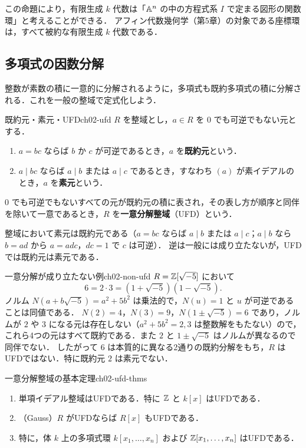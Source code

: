 この命題により，有限生成 $k$ 代数は「$\mathbb{A}^n$ の中の方程式系 $I$ で定まる図形の関数環」と考えることができる．
アフィン代数幾何学（第5章）の対象である座標環は，すべて被約な有限生成 $k$ 代数である．

\subsection{多項式の因数分解}

整数が素数の積に一意的に分解されるように，多項式も既約多項式の積に分解される．これを一般の整域で定式化しよう．

\begin{mydef}{既約元・素元・UFD}{ch02-ufd}
$R$ を整域とし，$a\in R$ を $0$ でも可逆でもない元とする．
\begin{enumerate}
  \item $a=bc$ ならば $b$ か $c$ が可逆であるとき，$a$ を\textbf{既約元}という．
  \item $a\mid bc$ ならば $a\mid b$ または $a\mid c$ であるとき，すなわち $(a)$ が素イデアルのとき，$a$ を\textbf{素元}という．
\end{enumerate}
$0$ でも可逆でもないすべての元が既約元の積に表され，その表し方が順序と同伴を除いて一意であるとき，$R$ を\textbf{一意分解整域}（UFD）という．
\end{mydef}

整域において素元は既約元である（$a=bc$ ならば $a\mid b$ または $a\mid c$；$a\mid b$ なら $b=ad$ から $a=adc$，$dc=1$ で $c$ は可逆）．
逆は一般には成り立たないが，UFDでは既約元は素元である．

\begin{myex}{一意分解が成り立たない例}{ch02-non-ufd}
$R=\mathbb{Z}[\sqrt{-5}]$ において
\[
  6=2\cdot3=(1+\sqrt{-5})(1-\sqrt{-5}).
\]
ノルム $N(a+b\sqrt{-5})=a^2+5b^2$ は乗法的で，$N(u)=1$ と $u$ が可逆であることは同値である．
$N(2)=4$，$N(3)=9$，$N(1\pm\sqrt{-5})=6$ であり，ノルムが $2$ や $3$ になる元は存在しない（$a^2+5b^2=2,3$ は整数解をもたない）ので，
これら4つの元はすべて既約である．また $2$ と $1\pm\sqrt{-5}$ はノルムが異なるので同伴でない．
したがって $6$ は本質的に異なる2通りの既約分解をもち，$R$ はUFDではない．特に既約元 $2$ は素元でない．
\end{myex}

\begin{mythm}{一意分解整域の基本定理}{ch02-ufd-thms}
\begin{enumerate}
  \item 単項イデアル整域はUFDである．特に $\mathbb{Z}$ と $k[x]$ はUFDである．
  \item （Gauss）$R$ がUFDならば $R[x]$ もUFDである．
  \item 特に，体 $k$ 上の多項式環 $k[x_1,\dots,x_n]$ および $\mathbb{Z}[x_1,\dots,x_n]$ はUFDである．
\end{enumerate}
\end{mythm}

